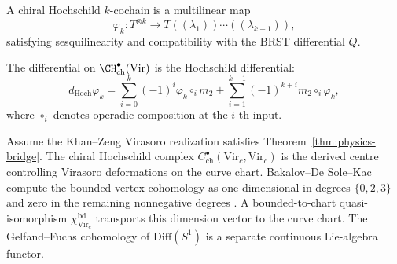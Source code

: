 \begin{definition}
A chiral Hochschild $k$-cochain is a multilinear map
\begin{equation}
\varphi_k: T^{\otimes k} \to T((\lambda_1))\cdots((\lambda_{k-1})),
\end{equation}
satisfying sesquilinearity and compatibility with the BRST differential $Q$.
\end{definition}

The differential on $\CH^\bullet_{\text{ch}}(\text{Vir})$ is the Hochschild differential:
\begin{equation}
\label{eq:hochschild-diff}
d_{\text{Hoch}} \varphi_k = \sum_{i=0}^k (-1)^i \varphi_k \circ_i m_2 + \sum_{i=1}^{k-1} (-1)^{k+i} m_2 \circ_i \varphi_k,
\end{equation}
where $\circ_i$ denotes operadic composition at the $i$-th input.

\begin{proposition}
\label{prop:vir-hochschild}
Assume the Khan--Zeng Virasoro realization satisfies
Theorem~\ref{thm:physics-bridge}.
The chiral Hochschild complex $C^\bullet_{\mathrm{ch}}(\mathrm{Vir}_c,
\mathrm{Vir}_c)$ is the derived centre controlling Virasoro
deformations on the curve chart.  Bakalov--De Sole--Kac \cite{BDSK21} compute the
bounded vertex cohomology as one-dimensional in degrees
$\{0,2,3\}$ and zero in the remaining nonnegative degrees
\cite[Theorem~7.2]{BDSK21}.  A bounded-to-chart quasi-isomorphism
$\chi^{\mathrm{bd}}_{\mathrm{Vir}_c}$ transports this dimension vector
to the curve chart.  The Gelfand--Fuchs cohomology of
$\mathrm{Diff}(S^1)$ is a separate continuous Lie-algebra functor.
\end{proposition}

